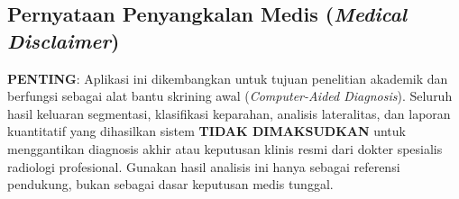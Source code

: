 \documentclass[12pt,a4paper]{article}
\begin{document}
\subsection{Pernyataan Penyangkalan Medis (\textit{Medical Disclaimer})}

\textbf{PENTING}: Aplikasi ini dikembangkan untuk tujuan penelitian akademik
dan berfungsi sebagai alat bantu skrining awal (\textit{Computer-Aided Diagnosis}).
Seluruh hasil keluaran segmentasi, klasifikasi keparahan, analisis lateralitas,
dan laporan kuantitatif yang dihasilkan sistem \textbf{TIDAK DIMAKSUDKAN} untuk
menggantikan diagnosis akhir atau keputusan klinis resmi dari dokter spesialis
radiologi profesional. Gunakan hasil analisis ini hanya sebagai referensi
pendukung, bukan sebagai dasar keputusan medis tunggal.
\end{document}
